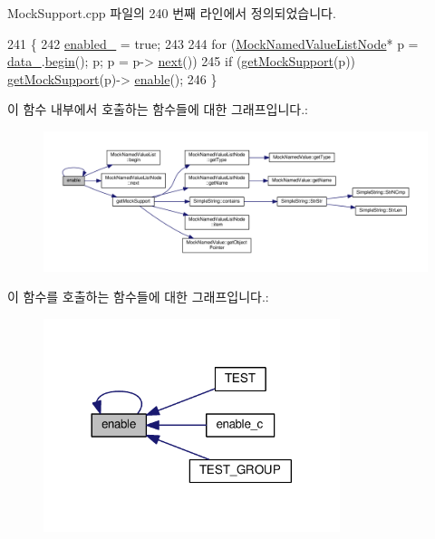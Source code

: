 Mock\+Support.\+cpp 파일의 240 번째 라인에서 정의되었습니다.


\begin{DoxyCode}
241 \{
242     \hyperlink{class_mock_support_ab6dfcb3e6c79f4def1295fea7f0de8c0}{enabled\_} = \textcolor{keyword}{true};
243 
244     \textcolor{keywordflow}{for} (\hyperlink{class_mock_named_value_list_node}{MockNamedValueListNode}* p = \hyperlink{class_mock_support_a26b06d2d43a7804c9aa5808409c0c1ee}{data\_}.\hyperlink{class_mock_named_value_list_a4a5976d05542385eb64ea73eee7fc59c}{begin}(); p; p = p->
      \hyperlink{class_mock_named_value_list_node_adaf0ca3232d35f7efae1bade86b8027e}{next}())
245         \textcolor{keywordflow}{if} (\hyperlink{class_mock_support_a575951d416e49f54fd1a3fc4823609e3}{getMockSupport}(p)) \hyperlink{class_mock_support_a575951d416e49f54fd1a3fc4823609e3}{getMockSupport}(p)->
      \hyperlink{class_mock_support_a486f22824bd83c5308a0d70ffac6f758}{enable}();
246 \}
\end{DoxyCode}


이 함수 내부에서 호출하는 함수들에 대한 그래프입니다.\+:
\nopagebreak
\begin{figure}[H]
\begin{center}
\leavevmode
\includegraphics[width=350pt]{class_mock_support_a486f22824bd83c5308a0d70ffac6f758_cgraph}
\end{center}
\end{figure}




이 함수를 호출하는 함수들에 대한 그래프입니다.\+:
\nopagebreak
\begin{figure}[H]
\begin{center}
\leavevmode
\includegraphics[width=245pt]{class_mock_support_a486f22824bd83c5308a0d70ffac6f758_icgraph}
\end{center}
\end{figure}


